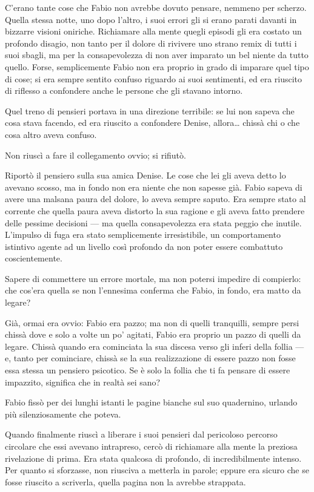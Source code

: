 C'erano tante cose che Fabio non avrebbe dovuto pensare, nemmeno per
scherzo. Quella stessa notte, uno dopo l'altro, i suoi errori gli si
erano parati davanti in bizzarre visioni oniriche. Richiamare alla mente
quegli episodi gli era costato un profondo disagio, non tanto per il
dolore di rivivere uno strano remix di tutti i suoi sbagli, ma per la
consapevolezza di non aver imparato un bel niente da tutto quello.
Forse, semplicemente Fabio non era proprio in grado di imparare quel
tipo di cose; si era sempre sentito confuso riguardo ai suoi sentimenti,
ed era riuscito di riflesso a confondere anche le persone che gli
stavano intorno.

Quel treno di pensieri portava in una direzione terribile: se lui non
sapeva che cosa stava facendo, ed era riuscito a confondere Denise,
allora\ldots{} chissà chi o che cosa altro aveva confuso.

Non riuscì a fare il collegamento ovvio; si rifiutò.

Riportò il pensiero sulla sua amica Denise. Le cose che lei gli aveva
detto lo avevano scosso, ma in fondo non era niente che non sapesse già.
Fabio sapeva di avere una malsana paura del dolore, lo aveva sempre
saputo. Era sempre stato al corrente che quella paura aveva distorto la
sua ragione e gli aveva fatto prendere delle pessime decisioni --- ma
quella consapevolezza era stata peggio che inutile. L'impulso di fuga
era stato semplicemente irresistibile, un comportamento istintivo agente
ad un livello così profondo da non poter essere combattuto
coscientemente.

Sapere di commettere un errore mortale, ma non potersi impedire di
compierlo: che cos'era quella se non l'ennesima conferma che Fabio, in
fondo, era matto da legare?

Già, ormai era ovvio: Fabio era pazzo; ma non di quelli tranquilli,
sempre persi chissà dove e solo a volte un po' agitati, Fabio era
proprio un pazzo di quelli da legare. Chissà quando era cominciata la
sua discesa verso gli inferi della follia --- e, tanto per cominciare,
chissà se la sua realizzazione di essere pazzo non fosse essa stessa un
pensiero psicotico. Se è solo la follia che ti fa pensare di essere
impazzito, significa che in realtà sei sano?

Fabio fissò per dei lunghi istanti le pagine bianche sul suo quadernino,
urlando più silenziosamente che poteva.

Quando finalmente riuscì a liberare i suoi pensieri dal pericoloso
percorso circolare che essi avevano intrapreso, cercò di richiamare alla
mente la preziosa rivelazione di prima. Era stata qualcosa di profondo,
di incredibilmente intenso. Per quanto si sforzasse, non riusciva a
metterla in parole; eppure era sicuro che se fosse riuscito a scriverla,
quella pagina non la avrebbe strappata.

